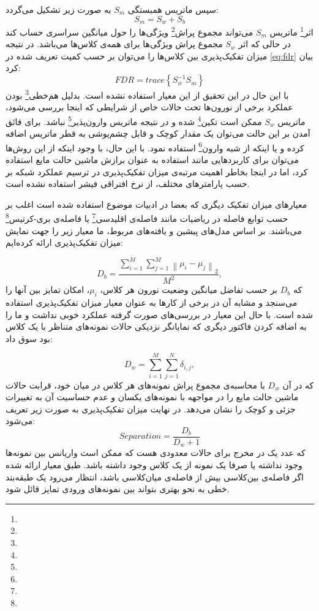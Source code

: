 سپس ماتریس همبستگی $S_m$ به صورت زیر تشکیل می‌گردد:
\begin{equation} 
S_m = S_w + S_b
\end{equation} 
اثر\footnote{} ماتریس $S_m$ می‌تواند مجموع پراش\footnote{} ویژگی‌ها را حول میانگین سراسری حساب کند در حالی که اثر $S_w$ مجموع پراش ویژگی‌ها برای همه‌ی کلاس‌ها می‌باشد. در نتیجه میزان تفکیک‌پذیری بین کلاس‌ها را می‌توان بر حسب کمیت تعریف شده در \ref{eq:fdr} بیان کرد:
\begin{equation}\label{eq:fdr}
FDR = trace\left \{ S^{-1}_w S_m \right \}
\end{equation} 
با این حال در این تحقیق از این معیار استفاده نشده است. بدلیل هم‌خطی\footnote{} بودن عملکرد برخی از نورون‌ها تحت حالات خاص از شرایطی که اینجا بررسی می‌شود، ماتریس $S_w$ ممکن است تکین\footnote{} شده و در نتیجه ماتریس وارون‌پذیر\footnote{} نباشد. برای فائق آمدن بر این حالت می‌توان یک مقدار کوچک و قابل چشم‌پوشی به قطر ماتریس اضافه کرده و یا اینکه از شبه وارون\footnote{} استفاده نمود. با این حال، با وجود اینکه از این روش‌ها می‌توان برای کاربردهایی مانند استفاده به عنوان برازش ماشین حالت مایع استفاده کرد، اما در اینجا بخاطر اهمیت مرتبه‌ی میزان تفکیک‌پذیری در ترسیم عملکرد شبکه بر حسب پارامتر‌های مختلف، از نرخ افتراقی فیشر استفاده نشده است.

معیارهای میزان تفکیک دیگری که بعضا در ادبیات موضوع استفاده شده است اغلب بر حسب توابع فاصله در ریاضیات مانند فاصله‌ی اقلیدسی\footnote{}\cite{grzyb2009model,norton2006preparing} یا فاصله‌ی بری-کرتیس\footnote{}\cite{wojcik2015bray}
می‌باشند. بر اساس مدل‌های پیشین و یافته‌های مربوط، ما معیار زیر را جهت نمایش میزان تفکیک‌پذیری ارائه کرده‌ایم:

\begin{equation}\label{eq:betw}
D_b = \frac{\sum_{i=1}^{M}\sum_{j=1}^{M}\left \| \mu_i -\mu_j \right \|_2}{M^2},
\end{equation} 
که $D_b$ بر حسب تفاضل میانگین وضعیت نورون هر کلاس، $\mu_i$، امکان تمایز بین آنها را می‌سنجد و مشابه آن در برخی از کارها \cite{norton2006preparing} به عنوان معیار میزان تفکیک‌پذیری استفاده شده است. با حال این معیار در بررسی‌های صورت گرفته عملکرد خوبی نداشت و ما را به اضافه کردن فاکتور دیگری که نمایانگر نزدیکی حالات نمونه‌های متناظر با یک کلاس بود سوق داد:

\begin{equation}\label{eq:withi}
D_w = \sum_{i=1}^{M}\sum_{j=1}^{N}\delta_{i,j},
\end{equation} 
که در آن $D_w$ با محاسبه‌ی مجموع پراش نمونه‌های هر کلاس در میان خود، قرابت حالات ماشین حالت مایع را در مواجهه با نمونه‌های یکسان و عدم حساسیت آن به تغییرات جزئی و کوچک را نشان می‌دهد. در نهایت میزان تفکیک‌پذیری به صورت زیر تعریف می‌شود:
\begin{equation}\label{eq:separ}
Separation = \frac{D_b}{D_w+1}
\end{equation} 
که عدد یک در مخرج برای حالات معدودی هست که ممکن است واریانس بین نمونه‌ها وجود نداشته یا صرفا یک نمونه از یک کلاس وجود داشته باشد. طبق معیار ارائه شده اگر فاصله‌ی بین‌کلاسی بیش از فاصله‌ی میان‌کلاسی باشد، انتظار می‌رود یک طبقه‌بند خطی به نحو بهتری بتواند بین نمونه‌های ورودی تمایز قائل شود.

